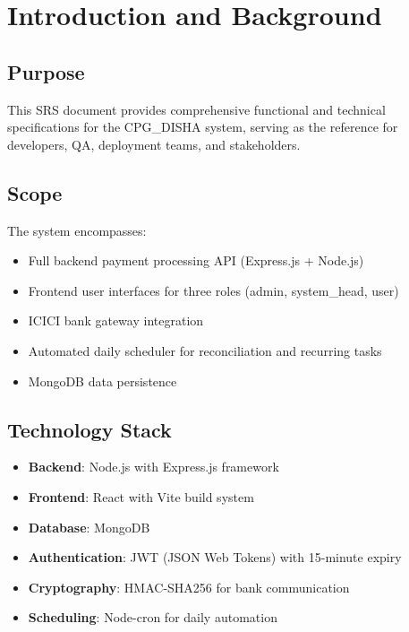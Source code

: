 \documentclass[12pt,a4paper]{article}
\begin{document}
\section{Introduction and Background}

\subsection{Purpose}
This SRS document provides comprehensive functional and technical specifications for the CPG\_DISHA system, serving as the reference for developers, QA, deployment teams, and stakeholders.

\subsection{Scope}
The system encompasses:
\begin{itemize}
  \item Full backend payment processing API (Express.js + Node.js)
  \item Frontend user interfaces for three roles (admin, system\_head, user)
  \item ICICI bank gateway integration
  \item Automated daily scheduler for reconciliation and recurring tasks
  \item MongoDB data persistence
\end{itemize}

\subsection{Technology Stack}
\begin{itemize}
  \item \textbf{Backend}: Node.js with Express.js framework
  \item \textbf{Frontend}: React with Vite build system
  \item \textbf{Database}: MongoDB
  \item \textbf{Authentication}: JWT (JSON Web Tokens) with 15-minute expiry
  \item \textbf{Cryptography}: HMAC-SHA256 for bank communication
  \item \textbf{Scheduling}: Node-cron for daily automation
\end{itemize}

\end{document}
